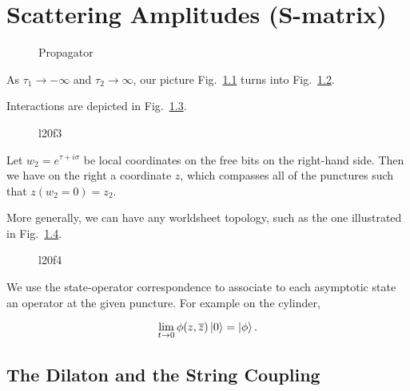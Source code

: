 
\chapter{Scattering Amplitudes (S-matrix)}%
\label{cha:scattering_amplitudes_s_matrix_}

\begin{figure}[ht]
    \centering
    \caption{Propagator}
    \label{fig:propagator}
\end{figure}

As $\tau_1 \to -\infty$ and $\tau_2 \to \infty$, our picture Fig.~\ref{fig:propagator} turns into Fig.~\ref{fig:l20f2}.
\begin{figure}[ht]
    \centering
    \caption{}
    \label{fig:l20f2}
\end{figure}

Interactions are depicted in Fig.~\ref{fig:l20f3}.
\begin{figure}[ht]
    \centering
    \caption{l20f3}
    \label{fig:l20f3}
\end{figure}
Let $w_2 = e^{\tau + i \sigma}$ be local coordinates on the free bits on the right-hand side. Then we have on the right a coordinate $z$, which compasses all of the punctures such that $z(w_2 = 0) = z_2$.

More generally, we can have any worldsheet topology, such as the one illustrated in Fig.~\ref{fig:l20f4}.
\begin{figure}[ht]
    \centering
    \caption{l20f4}
    \label{fig:l20f4}
\end{figure}
We use the state-operator correspondence to associate to each asymptotic state an operator at the given puncture.
For example on the cylinder, 
\begin{figure}[ht]
    \centering
    \caption{}
    \label{fig:l20f5}
\end{figure}
\begin{equation}
  \lim_{t \to 0}  \phi(z, \overline{z}{}) \ket{0} = \ket{\phi}.
\end{equation}

\section{The Dilaton and the String Coupling}%
\label{sec:the_dilaton_and_the_string_coupling}

